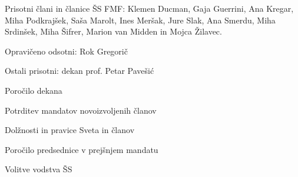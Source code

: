 \documentclass{seja}
\begin{document}
Prisotni člani in članice ŠS FMF: Klemen Ducman, Gaja Guerrini, Ana Kregar, Miha Podkrajšek, Saša Marolt, Ines Meršak, Jure Slak, Ana Smerdu, Miha Srdinšek, Miha Šifrer, Marion van Midden in Mojca Žilavec.

Opravičeno odsotni: Rok Gregorič

Ostali prisotni: dekan prof. Petar Pavešić

\begin{red*}
\item Poročilo dekana
\item Potrditev mandatov novoizvoljenih članov
\item Dolžnosti in pravice Sveta in članov
\item Poročilo predsednice v prejšnjem mandatu
\item Volitve vodstva ŠS
\end{red*}
\end{document}
